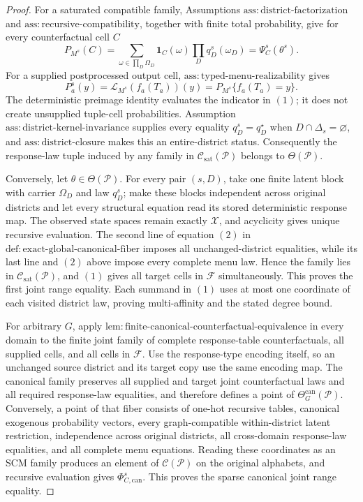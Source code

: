 \documentclass{article}
\begin{document}
\begin{proof}
For a saturated compatible family, Assumptions
\(\mathrm{ass:district\text{-}factorization}\) and
\(\mathrm{ass:recursive\text{-}compatibility}\), together with finite total
probability, give for every counterfactual cell \(C\)
\[
P_{M^s}(C)=
\sum_{\omega\in\prod_D\Omega_D}
\mathbf1_C(\omega)\prod_Dq_D^s(\omega_D)
=\Psi_C^s(\theta^s).
\tag{1}
\]
For a supplied postprocessed output cell,
\(\mathrm{ass:typed\text{-}menu\text{-}realizability}\) gives
\[
P_a^s(y)=\mathcal L_{M^s}(f_a(T_a))(y)
=P_{M^s}\{f_a(T_a)=y\}.
\tag{2}
\]
The deterministic preimage identity evaluates the indicator in \((1)\); it does
not create unsupplied tuple-cell probabilities.  Assumption
\(\mathrm{ass:district\text{-}kernel\text{-}invariance}\) supplies every equality
\(q_D^s=q_D^\star\) when \(D\cap\Delta_s=\varnothing\), and
\(\mathrm{ass:district\text{-}closure}\) makes this an entire-district status.
Consequently the response-law tuple induced by any family in
\(\mathcal C_{\mathrm{sat}}(\mathcal P)\) belongs to
\(\Theta(\mathcal P)\).

Conversely, let \(\theta\in\Theta(\mathcal P)\).  For every pair \((s,D)\), take
one finite latent block with carrier \(\Omega_D\) and law \(q_D^s\); make these
blocks independent across original districts and let every structural equation read
its stored deterministic response map.  The observed state spaces remain exactly
\(\mathcal X\), and acyclicity gives unique recursive evaluation.  The second line
of equation \((2)\) in
\(\mathrm{def:exact\text{-}global\text{-}canonical\text{-}fiber}\) imposes all
unchanged-district equalities, while its last line and \((2)\) above impose every
complete menu law.  Hence the family lies in
\(\mathcal C_{\mathrm{sat}}(\mathcal P)\), and \((1)\) gives all target cells in
\(\mathcal F\) simultaneously.  This proves the first joint range equality.  Each
summand in \((1)\) uses at most one coordinate of each visited district law, proving
multi-affinity and the stated degree bound.

For arbitrary \(G\), apply
\(\mathrm{lem:finite\text{-}canonical\text{-}counterfactual\text{-}equivalence}\)
in every domain to the finite joint family of complete response-table
counterfactuals, all supplied cells, and all cells in \(\mathcal F\).  Use the
response-type encoding itself, so an unchanged source district and its target copy
use the same encoding map.  The canonical family preserves all supplied and target
joint counterfactual laws and all required response-law equalities, and therefore
defines a point of \(\Theta_G^{\mathrm{can}}(\mathcal P)\).  Conversely, a point of
that fiber consists of one-hot recursive tables, canonical exogenous probability
vectors, every graph-compatible within-district latent restriction, independence
across original districts, all cross-domain response-law equalities, and all
complete menu equations.  Reading these coordinates as an SCM family produces an
element of \(\mathcal C(\mathcal P)\) on the original alphabets, and recursive
evaluation gives \(\Phi_{C,\mathrm{can}}^s\).  This proves the sparse canonical
joint range equality.


\end{proof}
\end{document}
